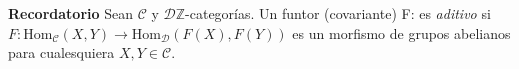 \documentclass[preview]{standalone}
\begin{document}
\begin{center}
\flushleft \textbf{Recordatorio} Sean $\mathscr{C}$ y $\mathscr{D} \mathbb{Z}$-categorías. Un funtor (covariante) F:\to{} es \emph{aditivo} si $F:\text{Hom}_\mathscr{C}(X,Y)\to \text{Hom}_\mathscr{D}(F(X), F(Y))$ es un morfismo de grupos abelianos para cualesquiera $X,Y\in\mathscr{C}$.
\end{center}
\end{document}
